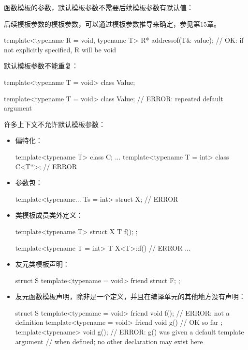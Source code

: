 函数模板的参数，默认模板参数不需要后续模板参数有默认值：

\begin{notice}
后续模板参数的模板参数，可以通过模板参数推导来确定，参见第15章。
\end{notice}

\begin{cpp}
template<typename R = void, typename T>
R* addressof(T& value); // OK: if not explicitly specified, R will be void
\end{cpp}

默认模板参数不能重复：

\begin{cpp}
template<typename T = void>
class Value;

template<typename T = void>
class Value; // ERROR: repeated default argument
\end{cpp}

许多上下文不允许默认模板参数：

\begin{itemize}
\item 
偏特化：

\begin{cpp}
template<typename T>
class C;
...
template<typename T = int>
class C<T*>; // ERROR
\end{cpp}

\item 
参数包：

\begin{cpp}
template<typename... Ts = int> struct X; // ERROR
\end{cpp}

\item 
类模板成员类外定义：

\begin{cpp}
template<typename T> struct X
{
	T f();
};

template<typename T = int> T X<T>::f() { // ERROR
	...
}
\end{cpp}

\item 
友元类模板声明：

\begin{cpp}
struct S {
	template<typename = void> friend struct F;
};
\end{cpp}

\item 
友元函数模板声明，除非是一个定义，并且在编译单元的其他地方没有声明：

\begin{cpp}
struct S {
	template<typename = void> friend void f(); // ERROR: not a definition
	template<typename = void> friend void g() { // OK so far
	}
};
template<typename> void g(); // ERROR: g() was given a default template argument
// when defined; no other declaration may exist here
\end{cpp}

\end{itemize}















